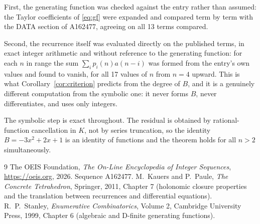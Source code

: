 \documentclass[11pt,a4paper]{article}
\theoremstyle{plain}
\theoremstyle{definition}
\begin{document}
First, the generating function was checked against the entry rather than assumed: the
Taylor coefficients of \eqref{eq:gf} were expanded and compared term by term with the DATA
section of A162477, agreeing on all 13 terms compared.

Second, the recurrence itself was evaluated directly on the published terms, in exact
integer arithmetic and without reference to the generating function: for each $n$ in range
the sum $\sum_{i}p_{i}(n)a(n-i)$ was formed from the entry's own values and found to
vanish, for all 17 values of $n$ from $n=4$ upward. This is what
Corollary~\ref{cor:criterion} predicts from the degree of $B$, and it is a genuinely
different computation from the symbolic one: it never forms $B$, never differentiates, and
uses only integers.

The symbolic step is exact throughout. The residual is obtained by rational-function
cancellation in $K$, not by series truncation, so the identity $B=- 3 x^{2} + 2 x + 1$ is an
identity of functions and the theorem holds for all $n>2$ simultaneously.

\begin{thebibliography}{9}
 The OEIS Foundation, \emph{The On-Line Encyclopedia of Integer Sequences},
\url{https://oeis.org}, 2026. Sequence A162477.
 M.~Kauers and P.~Paule, \emph{The Concrete Tetrahedron}, Springer, 2011,
Chapter 7 (holonomic closure properties and the translation between recurrences and
differential equations).
 R.~P.~Stanley, \emph{Enumerative Combinatorics}, Volume 2, Cambridge
University Press, 1999, Chapter 6 (algebraic and D-finite generating functions).
\end{thebibliography}
\end{document}
